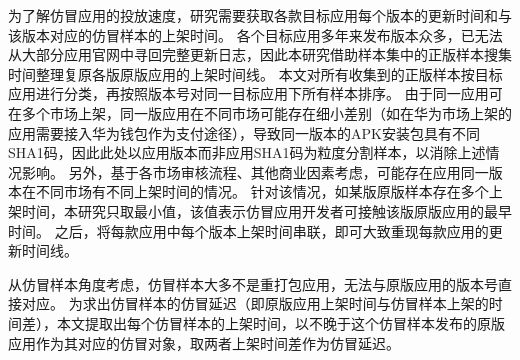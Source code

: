 为了解仿冒应用的投放速度，研究需要获取各款目标应用每个版本的更新时间和与该版本对应的仿冒样本的上架时间。
各个目标应用多年来发布版本众多，已无法从大部分应用官网中寻回完整更新日志，因此本研究借助样本集中的正版样本搜集时间整理复原各版原版应用的上架时间线。
本文对所有收集到的正版样本按目标应用进行分类，再按照版本号对同一目标应用下所有样本排序。
由于同一应用可在多个市场上架，同一版应用在不同市场可能存在细小差别（如在华为市场上架的应用需要接入华为钱包作为支付途径），导致同一版本的APK安装包具有不同SHA1码，因此此处以应用版本而非应用SHA1码为粒度分割样本，以消除上述情况影响。
另外，基于各市场审核流程、其他商业因素考虑，可能存在应用同一版本在不同市场有不同上架时间的情况。
针对该情况，如某版原版样本存在多个上架时间，本研究只取最小值，该值表示仿冒应用开发者可接触该版原版应用的最早时间。
之后，将每款应用中每个版本上架时间串联，即可大致重现每款应用的更新时间线。


从仿冒样本角度考虑，仿冒样本大多不是重打包应用，无法与原版应用的版本号直接对应。
为求出仿冒样本的仿冒延迟（即原版应用上架时间与仿冒样本上架的时间差），本文提取出每个仿冒样本的上架时间，以不晚于这个仿冒样本发布的原版应用作为其对应的仿冒对象，取两者上架时间差作为仿冒延迟。






